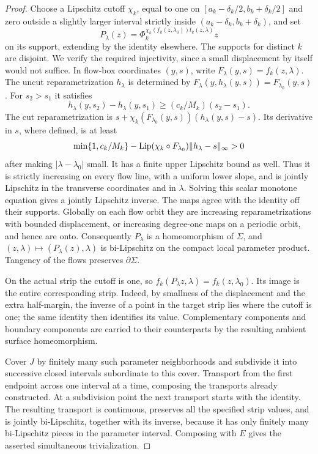 \begin{proof}
Choose a Lipschitz cutoff $\chi_k$, equal to one on
$[a_k-\delta_k/2,b_k+\delta_k/2]$ and zero outside a slightly
larger interval strictly inside
$(a_k-\delta_k,b_k+\delta_k)$, and set
\[
 P_\lambda(z)=
 \Phi_k^{\chi_k(f_k(z,\lambda_0))t_k(z,\lambda)}z
\]
on its support, extending by the identity elsewhere.  The supports
for distinct $k$ are disjoint.  We verify the required injectivity,
since a small displacement by itself would not suffice.  In flow-box
coordinates $(y,s)$, write $F_\lambda(y,s)=f_k(z,\lambda)$.
The uncut reparametrization $h_\lambda$ is determined by
$F_\lambda(y,h_\lambda(y,s))=F_{\lambda_0}(y,s)$.
For $s_2>s_1$ it satisfies
\[
 h_\lambda(y,s_2)-h_\lambda(y,s_1)
       \geq (c_k/M_k)(s_2-s_1).
\]
The cut reparametrization is
$s+\chi_k(F_{\lambda_0}(y,s))(h_\lambda(y,s)-s)$.
Its derivative in $s$, where defined, is at least
\[
 \min\{1,c_k/M_k\}
 -\operatorname{Lip}(\chi_k\circ F_{\lambda_0})
                      \|h_\lambda-s\|_\infty>0
\]
after making $|\lambda-\lambda_0|$ small.  It has a finite upper
Lipschitz bound as well.  Thus it is strictly increasing on every
flow line, with a uniform lower slope, and is jointly Lipschitz in
the transverse coordinates and in $\lambda$.  Solving this scalar
monotone equation gives a jointly Lipschitz inverse.  The maps agree
with the identity off their supports.  Globally on each flow orbit
they are increasing reparametrizations with bounded displacement,
or increasing degree-one maps on a periodic orbit, and hence are
onto.  Consequently $P_\lambda$ is a homeomorphism of $\Sigma$,
and $(z,\lambda)\mapsto(P_\lambda(z),\lambda)$ is bi-Lipschitz
on the compact local parameter product.  Tangency of the flows
preserves $\partial\Sigma$.

On the actual strip the cutoff is one, so
$f_k(P_\lambda z,\lambda)=f_k(z,\lambda_0)$.
Its image is the entire corresponding strip.  Indeed, by smallness
of the displacement and the extra half-margin, the inverse of a
point in the target strip lies where the cutoff is one; the same
identity then identifies its value.  Complementary components and
boundary components are carried to their counterparts by the
resulting ambient surface homeomorphism.

Cover $J$ by finitely many such parameter neighborhoods and
subdivide it into successive closed intervals subordinate to this
cover.  Transport from the first endpoint across one interval at a
time, composing the transports already constructed.  At a subdivision
point the next transport starts with the identity.  The resulting
transport is continuous, preserves all the specified strip values,
and is jointly bi-Lipschitz, together with its inverse, because it
has only finitely many bi-Lipschitz pieces in the parameter interval.
Composing with $E$ gives the asserted simultaneous trivialization.


\end{proof}
